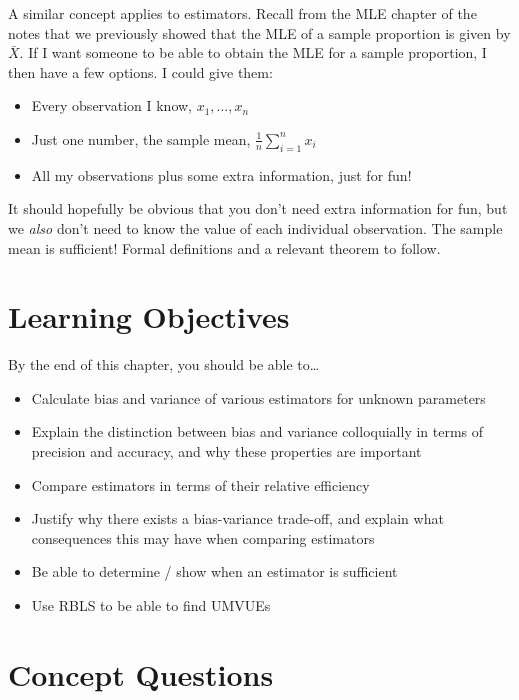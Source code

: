 \documentclass[
  letterpaper,
  DIV=11,
  numbers=noendperiod]{scrreprt}
\providecommand{\tightlist}{%
  \setlength{\itemsep}{0pt}\setlength{\parskip}{0pt}}\usepackage{longtable,booktabs,array}
\begin{document}
A similar concept applies to estimators. Recall from the MLE chapter of
the notes that we previously showed that the MLE of a sample proportion
is given by \(\bar{X}\). If I want someone to be able to obtain the MLE
for a sample proportion, I then have a few options. I could give them:

\begin{itemize}
\tightlist
\item
  Every observation I know, \(x_1, \dots,x_n\)
\item
  Just one number, the sample mean, \(\frac{1}{n}\sum_{i = 1}^n x_i\)
\item
  All my observations plus some extra information, just for fun!
\end{itemize}

It should hopefully be obvious that you don't need extra information for
fun, but we \emph{also} don't need to know the value of each individual
observation. The sample mean is sufficient! Formal definitions and a
relevant theorem to follow.

\section{Learning Objectives}\label{learning-objectives-3}

By the end of this chapter, you should be able to\ldots{}

\begin{itemize}
\item
  Calculate bias and variance of various estimators for unknown
  parameters
\item
  Explain the distinction between bias and variance colloquially in
  terms of precision and accuracy, and why these properties are
  important
\item
  Compare estimators in terms of their relative efficiency
\item
  Justify why there exists a bias-variance trade-off, and explain what
  consequences this may have when comparing estimators
\item
  Be able to determine / show when an estimator is sufficient
\item
  Use RBLS to be able to find UMVUEs
\end{itemize}

\section{Concept Questions}\label{concept-questions-3}
\end{document}
